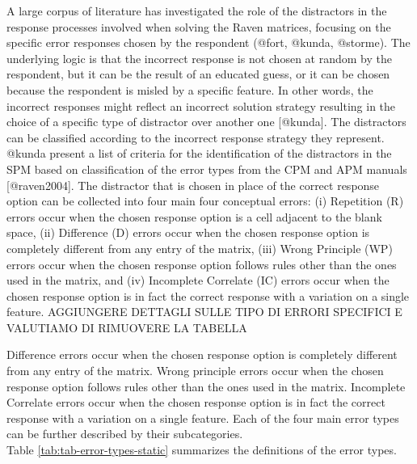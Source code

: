 A large corpus of literature has investigated the role of the distractors in the response processes involved when solving the Raven matrices, focusing on the specific error responses chosen by the respondent (@fort, @kunda, @storme).
The underlying logic is that the incorrect response is not chosen at random by the respondent, but it can be the result of an educated guess, or it can be chosen because the respondent is misled by a specific feature.
In other words, the incorrect responses might reflect an incorrect solution strategy resulting in the choice of a specific type of distractor over another one {[}@kunda{]}.
The distractors can be classified according to the incorrect response strategy they represent.
@kunda present a list of criteria for the identification of the distractors in the SPM based on classification of the error types from the CPM and APM manuals {[}@raven2004{]}.
The distractor that is chosen in place of the correct response option can be collected into four main four conceptual errors: (i) Repetition (R) errors occur when the chosen response option is a cell adjacent to the blank space, (ii) Difference (D) errors occur when the chosen response option is completely different from any entry of the matrix, (iii) Wrong Principle (WP) errors occur when the chosen response option follows rules other than the ones used in the matrix, and (iv) Incomplete Correlate (IC) errors occur when the chosen response option is in fact the correct response with a variation on a single feature. AGGIUNGERE DETTAGLI SULLE TIPO DI ERRORI SPECIFICI E VALUTIAMO DI RIMUOVERE LA TABELLA

Difference errors occur when the chosen response option is completely different from any entry of the matrix.
Wrong principle errors occur when the chosen response option follows rules other than the ones used in the matrix.
Incomplete Correlate errors occur when the chosen response option is in fact the correct response with a variation on a single feature.
Each of the four main error types can be further described by their subcategories.\\
Table \ref{tab:tab-error-types-static} summarizes the definitions of the error types.

